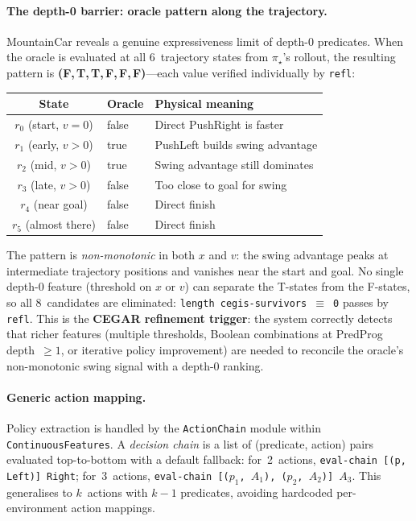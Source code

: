 \documentclass[9pt,a4paper]{article}
\theoremstyle{plain}
\theoremstyle{definition}
\theoremstyle{remark}
\begin{document}
\paragraph{The depth-0 barrier: oracle pattern along the trajectory.}
MountainCar reveals a genuine expressiveness limit of depth-0 predicates.  When the oracle is evaluated at all 6~trajectory states from $\pi_\star$'s rollout, the resulting pattern is \textbf{(F,\,T,\,T,\,F,\,F,\,F)}---each value verified individually by \texttt{refl}:

\begin{center}
\begin{tabular}{cll}
\textbf{State} & \textbf{Oracle} & \textbf{Physical meaning} \\
\hline
$r_0$ (start, $v{=}0$)     & false & Direct PushRight is faster \\
$r_1$ (early, $v{>}0$)     & true  & PushLeft builds swing advantage \\
$r_2$ (mid, $v{>}0$)       & true  & Swing advantage still dominates \\
$r_3$ (late, $v{>}0$)      & false & Too close to goal for swing \\
$r_4$ (near goal)           & false & Direct finish \\
$r_5$ (almost there)        & false & Direct finish \\
\end{tabular}
\end{center}

The pattern is \emph{non-monotonic} in both $x$ and $v$: the swing advantage peaks at intermediate trajectory positions and vanishes near the start and goal.  No single depth-0 feature (threshold on $x$ or $v$) can separate the T-states from the F-states, so all 8~candidates are eliminated: \texttt{length~cegis-survivors~$\equiv$~0} passes by \texttt{refl}.  This is the \textbf{CEGAR refinement trigger}: the system correctly detects that richer features (multiple thresholds, Boolean combinations at PredProg depth~$\ge 1$, or iterative policy improvement) are needed to reconcile the oracle's non-monotonic swing signal with a depth-0 ranking.

\paragraph{Generic action mapping.}
Policy extraction is handled by the \texttt{ActionChain} module within \texttt{ContinuousFeatures}.  A \emph{decision chain} is a list of (predicate, action) pairs evaluated top-to-bottom with a default fallback: for~2~actions, \texttt{eval-chain [(p, Left)] Right}; for~3~actions, \texttt{eval-chain [($p_1$, $A_1$), ($p_2$, $A_2$)] $A_3$}.  This generalises to $k$~actions with $k{-}1$ predicates, avoiding hardcoded per-environment action mappings.
\end{document}
